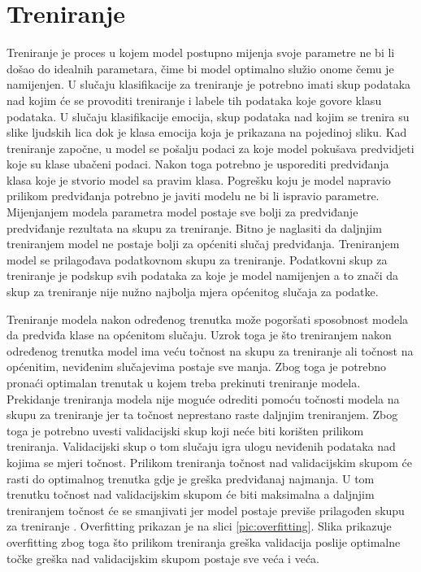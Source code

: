 \documentclass[times, utf8, zavrsni,numeric,pstricks]{fer}
\begin{document}
\chapter{Treniranje}
Treniranje je proces u kojem model postupno mijenja svoje parametre ne bi li došao do idealnih parametara, čime bi model optimalno služio onome čemu je namijenjen. U slučaju klasifikacije za treniranje je potrebno imati skup podataka nad kojim će se provoditi treniranje i labele tih podataka koje govore klasu podataka. U slučaju klasifikacije emocija, skup podataka nad kojim se trenira su slike ljudskih lica dok je klasa emocija koja je prikazana na pojedinoj sliku. Kad treniranje započne, u model se pošalju podaci za koje model pokušava predvidjeti koje su klase ubačeni podaci. Nakon toga potrebno je usporediti predviđanja klasa koje je stvorio model sa pravim klasa. Pogrešku koju je model napravio prilikom predviđanja potrebno je javiti modelu ne bi li ispravio parametre. Mijenjanjem modela parametra model postaje sve bolji za predviđanje predviđanje rezultata na skupu za treniranje. Bitno je naglasiti da daljnjim treniranjem model ne postaje bolji za općeniti slučaj predviđanja. Treniranjem model se prilagođava podatkovnom skupu za treniranje. Podatkovni skup za treniranje je podskup svih podataka za koje je model namijenjen a to znači da skup za treniranje nije nužno najbolja mjera općenitog slučaja za podatke. 


Treniranje modela nakon određenog trenutka može pogoršati sposobnost modela da predviđa klase na općenitom slučaju. Uzrok toga je što treniranjem nakon određenog trenutka model ima veću točnost na skupu za treniranje ali točnost na općenitim, neviđenim slučajevima postaje sve manja. Zbog toga je potrebno pronaći optimalan trenutak u kojem treba prekinuti treniranje modela. Prekidanje treniranja modela nije moguće odrediti pomoću točnosti modela na skupu za treniranje jer ta točnost neprestano raste daljnjim treniranjem. Zbog toga je potrebno uvesti validacijski skup koji neće biti korišten prilikom treniranja. Validacijski skup o tom slučaju igra ulogu neviđenih podataka nad kojima se mjeri točnost. Prilikom treniranja točnost nad validacijskim skupom će rasti do optimalnog trenutka gdje je greška predviđanaj najmanja. U tom trenutku točnost nad validacijskim skupom će biti maksimalna a daljnjim treniranjem točnost će se smanjivati jer model postaje previše prilagođen skupu za treniranje . Overfitting prikazan je na slici \ref{pic:overfitting}. Slika prikazuje overfitting zbog toga što prilikom treniranja greška validacija poslije optimalne točke greška nad validacijskim skupom postaje sve veća i veća.
\end{document}
